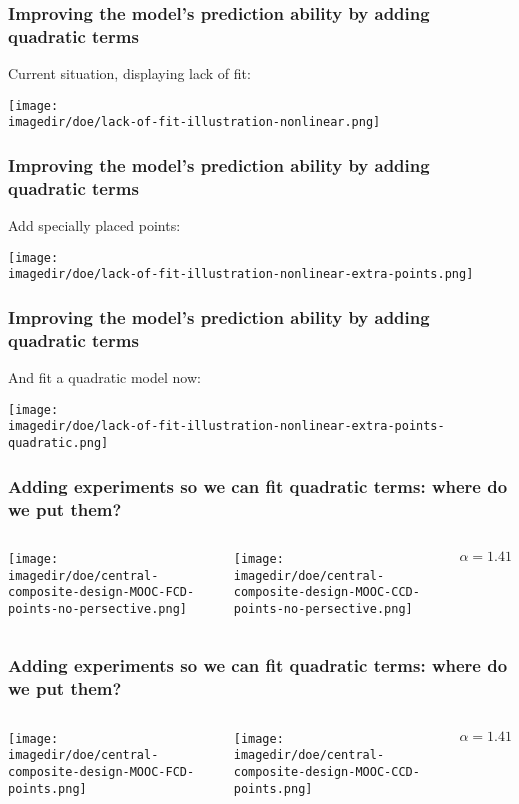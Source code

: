 \begin{frame}\frametitle{Improving the model's prediction ability by adding quadratic terms}
	Current situation, displaying lack of fit:
	
	\centerline{\texttt{[image: \\imagedir/doe/lack-of-fit-illustration-nonlinear.png]}}
\end{frame}

\begin{frame}\frametitle{Improving the model's prediction ability by adding quadratic terms}
	Add specially placed points:
	
	\centerline{\texttt{[image: \\imagedir/doe/lack-of-fit-illustration-nonlinear-extra-points.png]}}
\end{frame}

\begin{frame}\frametitle{Improving the model's prediction ability by adding quadratic terms}
	And fit a quadratic model now:
	
	\centerline{\texttt{[image: \\imagedir/doe/lack-of-fit-illustration-nonlinear-extra-points-quadratic.png]}}
\end{frame}

\begin{frame}\frametitle{Adding experiments so we can fit quadratic terms: where do we put them?}
	\begin{columns}[T]
			\centerline{\texttt{[image: \\imagedir/doe/central-composite-design-MOOC-FCD-points-no-persective.png]}}
			\centerline{\texttt{[image: \\imagedir/doe/central-composite-design-MOOC-CCD-points-no-persective.png]}}
			\vspace{-0.5cm}
			\[\alpha = 1.41\]
	\end{columns}
\end{frame}

\begin{frame}\frametitle{Adding experiments so we can fit quadratic terms: where do we put them?}
	\begin{columns}[T]
			\centerline{\texttt{[image: \\imagedir/doe/central-composite-design-MOOC-FCD-points.png]}}
			\centerline{\texttt{[image: \\imagedir/doe/central-composite-design-MOOC-CCD-points.png]}}
			
			\vspace{-0.5cm}
			\[\alpha = 1.41\]
	\end{columns}
\end{frame}

